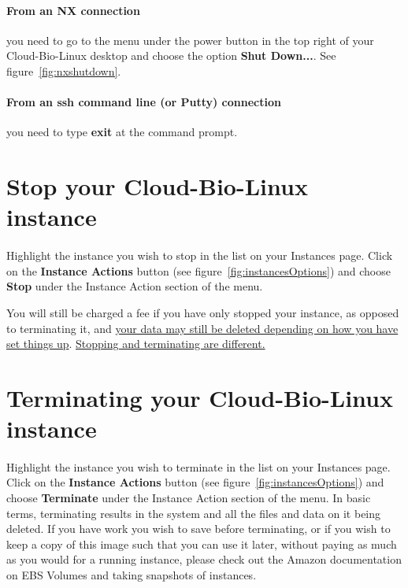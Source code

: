 \paragraph{From an NX connection} you need to go to the menu under the power button in the top right of your Cloud-Bio-Linux desktop and choose the option \textbf{Shut Down...}. See figure~\ref{fig:nxshutdown}.

\paragraph{From an ssh command line (or Putty) connection} you need to type \textbf{exit} at the command prompt.


\section{Stop your Cloud-Bio-Linux instance}

\paragraph{}Highlight the instance you wish to stop in the list on your Instances page. Click on the \textbf{Instance Actions} button (see figure~\ref{fig:instancesOptions}) and choose \textbf{Stop} under the Instance Action section of the menu. 

You will still be charged a fee if you have only stopped your instance, as opposed to terminating it, and 
\href{http://docs.amazonwebservices.com/AWSEC2/latest/UserGuide/index.html?Concepts\_BootFromEBS.html\#Stop\_Start} {your data may still be deleted depending on how you have set things up}. \href{http://support.rightscale.com/06-FAQs/FAQ\_0149\_-_What\%27s\_the\_difference\_between\_Terminating\_and\_Stopping\_an\_EC2\_Instance\%3F}{Stopping and terminating are different.}

\section{Terminating your Cloud-Bio-Linux instance}

\paragraph{}Highlight the instance you wish to terminate in the list on your Instances page. Click on the \textbf{Instance Actions} button (see figure~\ref{fig:instancesOptions}) and choose \textbf{Terminate} under the Instance Action section of the menu. In basic terms, terminating results in the system and all the files and data on it being deleted. If you have work you wish to save before terminating, or if you wish to keep a copy of this image such that you can use it later, without paying as much as you would for a running instance, please check out the Amazon documentation on EBS Volumes and taking snapshots of instances.



